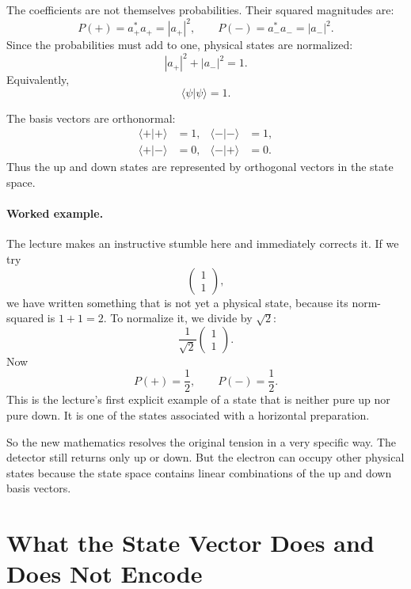 The coefficients are not themselves probabilities. Their squared magnitudes are:
\begin{equation}
P(+)=a_+^*a_+=|a_+|^2,
\qquad
P(-)=a_-^*a_-=|a_-|^2.
\end{equation}
Since the probabilities must add to one, physical states are normalized:
\begin{equation}
|a_+|^2+|a_-|^2=1.
\end{equation}
Equivalently,
\begin{equation}
\langle \psi|\psi\rangle = 1.
\end{equation}

The basis vectors are orthonormal:
\begin{align}
\langle +|+\rangle &= 1, &
\langle -|-\rangle &= 1, \\
\langle +|-\rangle &= 0, &
\langle -|+\rangle &= 0.
\end{align}
Thus the up and down states are represented by orthogonal vectors in the state space.

\paragraph{Worked example.}
The lecture makes an instructive stumble here and immediately corrects it. If we try
\[
\begin{pmatrix}1\\1\end{pmatrix},
\]
we have written something that is not yet a physical state, because its norm-squared is \(1+1=2\). To normalize it, we divide by \(\sqrt{2}\):
\begin{equation}
\frac{1}{\sqrt{2}}\begin{pmatrix}1\\1\end{pmatrix}.
\end{equation}
Now
\[
P(+)=\frac{1}{2},
\qquad
P(-)=\frac{1}{2}.
\]
This is the lecture's first explicit example of a state that is neither pure up nor pure down. It is one of the states associated with a horizontal preparation.

So the new mathematics resolves the original tension in a very specific way. The detector still returns only up or down. But the electron can occupy other physical states because the state space contains linear combinations of the up and down basis vectors.

\section{What the State Vector Does and Does Not Encode}


